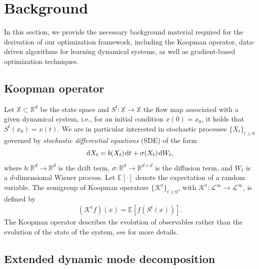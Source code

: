 \documentclass
[
    a4paper,
    DIV=11,
    abstract=true,
    11pt,
]
{scrartcl}
\newcommand{\R}{\mathbb{R}}                                      %
\newcommand{\ts}{\hspace*{0.1em}}                                %
\theoremstyle{definition}
\begin{document}
\section{Background}
\label{sec:background}

In this section, we provide the necessary background material required for the derivation of our optimization framework, including the Koopman operator, data-driven algorithms for learning dynamical systems, as well as gradient-based optimization techniques.

\subsection{Koopman operator}

Let $\mathbb{X} \subset \R^d$ be the state space and $S^t \colon \mathbb{X} \rightarrow \mathbb{X}$ the flow map associated with a given dynamical system, i.e., for an initial condition $ x(0) = x_0 $, it holds that $ S^t(x_0) = x(t)$. We are in particular interested in stochastic processes $ \{X_t\}_{t \geq 0} $ governed by \emph{stochastic differential equations} (SDE) of the form
\begin{equation*}
    \mathrm{d}X_t = b(X_t) \ts \mathrm{d}t + \sigma(X_t) \ts \mathrm{d}W_t,
\end{equation*}
where $ b \colon \R^d \rightarrow \R^d $ is the drift term, $\sigma \colon \R^d \rightarrow \R^{d \times d}$ is the diffusion term, and $ W_t $ is a $ d $-dimensional Wiener process. Let $ \mathbb{E}[\cdot] $ denote the expectation of a random variable. The semigroup of Koopman operators $ \{\mathcal{K}^t\}_{t \ge 0} $, with $\mathcal{K}^t \colon \mathcal{L}^\infty \rightarrow \mathcal{L}^\infty$, is defined by
\begin{align*}
    (\mathcal{K}^tf)(x) = \mathbb{E}[f(S^t(x))].
\end{align*}
The Koopman operator describes the evolution of observables rather than the evolution of the state of the system, see \cite{LaMa94, Mezic05, KKS16, hollingsworth2008stochastic} for more details.

\subsection{Extended dynamic mode decomposition}
\end{document}
